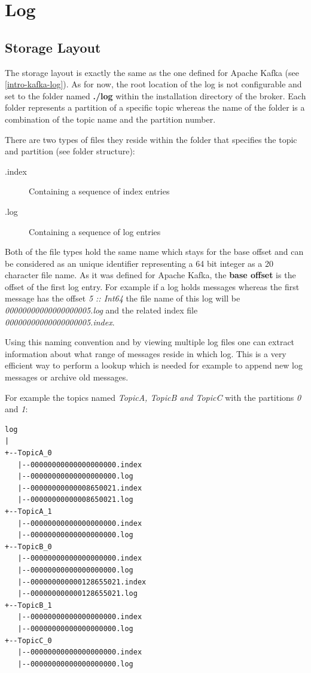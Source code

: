 \section{Log}
\label{sec:impl-broker-log}
\subsection{Storage Layout}
\label{log-broker-storage}

The storage layout is exactly the same as the one defined for Apache Kafka (see
\ref{intro-kafka-log}).  As for now, the root location of the log is not
configurable and set to the folder named \textbf{./log} within the installation
directory of the broker. Each folder represents a partition of a specific topic
whereas the name of the folder is a combination of the topic name and the
partition number. 

There are two types of files they reside within the folder that specifies the
topic and partition (see folder structure):

\begin{description}
    \item[.index] Containing a sequence of index entries
    \item[.log] Containing a sequence of log entries
\end{description}

Both of the file types hold the same name which stays for the base offset and
can be considered as an unique identifier representing a 64 bit integer as a 20
character file name. As it was defined for Apache Kafka, the \textbf{base
offset} is the offset of the first log entry. For example if a log holds
messages whereas the first message has the offset \textit{5 :: Int64} the file
name of this log will be \textit{00000000000000000005.log} and the related
index file \textit{00000000000000000005.index}.

Using this naming convention and by
viewing multiple log files one can extract information about what range of
messages reside in which log. This is a very efficient way to perform a lookup
which is needed for example to append new log messages or archive old messages.

For example the topics named \textit{TopicA, TopicB and TopicC} with the
partitions \textit{0} and \textit{1}:

\begin{verbatim}
log
|
+--TopicA_0
   |--00000000000000000000.index
   |--00000000000000000000.log
   |--00000000000008650021.index
   |--00000000000008650021.log
+--TopicA_1
   |--00000000000000000000.index
   |--00000000000000000000.log
+--TopicB_0
   |--00000000000000000000.index
   |--00000000000000000000.log
   |--000000000000128655021.index
   |--000000000000128655021.log
+--TopicB_1
   |--00000000000000000000.index
   |--00000000000000000000.log
+--TopicC_0
   |--00000000000000000000.index
   |--00000000000000000000.log
\end{verbatim}

